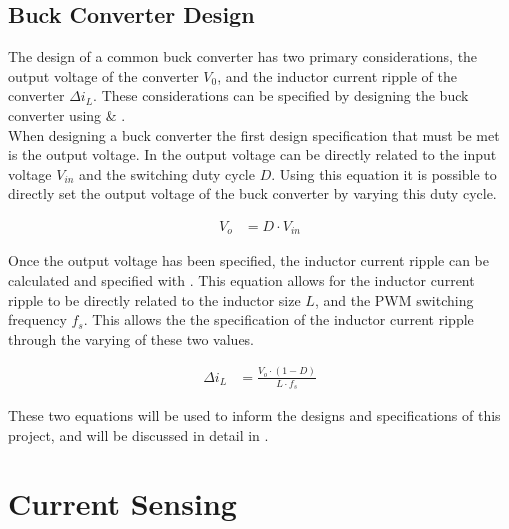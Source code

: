 \subsection{Buck Converter Design}\label{S:buck_design_back}

The design of a common buck converter has two primary considerations, the output voltage of the converter $V_0$, and the inductor current ripple of the converter $\Delta i_L$. These considerations can be specified by designing the buck converter using  \&  \cite{Mohan2012_Design,Hauke2015}.\\ 

When designing a buck converter the first design specification that must be met is the output voltage. In  the output voltage can be directly related to the input voltage $V_{in}$ and the switching duty cycle $D$. Using this equation it is possible to directly set the output voltage of the buck converter by varying this duty cycle.

\begin{align}\label{E:V_out}
	V_o &= D \cdot V_{in}
\end{align}

Once the output voltage has been specified, the inductor current ripple can be calculated and specified with . This equation allows for the inductor current ripple to be directly related to the inductor size $L$, and the PWM switching frequency $f_s$. This allows the the specification of the inductor current ripple through the varying of these two values.

\begin{align}\label{E:delta_i}
   \Delta i_L &= \frac{ V_{o} \cdot \left( 1 - D \right) } {L \cdot f_s}
\end{align}

These two equations will be used to inform the designs and specifications of this project, and will be discussed in detail in .




\section{Current Sensing}\label{S:current_sense_back}

